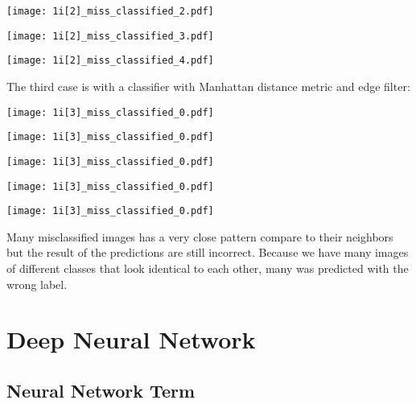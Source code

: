 \documentclass[11pt]{article}
\begin{document}
\texttt{[image: 1i[2]\_miss\_classified\_2.pdf]}

\texttt{[image: 1i[2]\_miss\_classified\_3.pdf]}

\texttt{[image: 1i[2]\_miss\_classified\_4.pdf]}

The third case is with a classifier with Manhattan distance metric and edge filter:

\texttt{[image: 1i[3]\_miss\_classified\_0.pdf]}

\texttt{[image: 1i[3]\_miss\_classified\_0.pdf]}

\texttt{[image: 1i[3]\_miss\_classified\_0.pdf]}

\texttt{[image: 1i[3]\_miss\_classified\_0.pdf]}

\texttt{[image: 1i[3]\_miss\_classified\_0.pdf]}

Many misclassified images has a very close pattern compare to their neighbors but the result of the predictions are still incorrect. Because we have many images of different classes that look identical to each other, many was predicted with the wrong label.

\section{Deep Neural Network}
\subsection{Neural Network Term}
\end{document}
